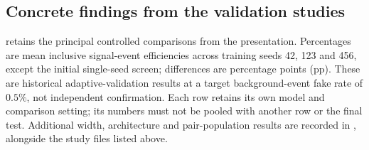 \clearpage
\subsection{Concrete findings from the validation studies}
\label{app:pair_history_findings}
 retains the principal controlled comparisons
from the presentation. Percentages are mean inclusive signal-event
efficiencies across training seeds 42, 123 and 456, except the initial
single-seed screen; differences are percentage points (pp). These are
historical adaptive-validation results at a target background-event fake rate
of $0.5\%$, not independent confirmation. Each row retains its own model and
comparison setting; its numbers must not be pooled with another row or the
final test. Additional width, architecture and pair-population results are
recorded in , alongside the study files
listed above.

